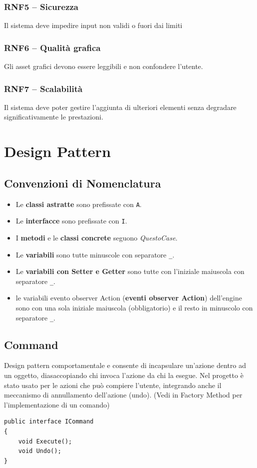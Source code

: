\subsubsection{RNF5 – Sicurezza}  Il sistema deve impedire input non validi o fuori dai limiti


\subsubsection{RNF6 – Qualità grafica} Gli asset grafici devono essere leggibili e non confondere l'utente.


\subsubsection{RNF7 – Scalabilità} Il sistema deve poter gestire l'aggiunta di ulteriori elementi senza degradare significativamente le prestazioni.

\section{Design Pattern}
\subsection{Convenzioni di Nomenclatura}

\begin{itemize}
  \item Le \textbf{classi astratte} sono prefissate con \texttt{A}.
  \item Le \textbf{interfacce} sono prefissate con \texttt{I}.
  \item I \textbf{metodi} e le \textbf{classi concrete} seguono \textit{QuestoCase}.
  \item Le \textbf{variabili} sono tutte minuscole con separatore \texttt{\_}.
  \item Le \textbf{variabili con Setter e Getter} sono tutte con l'iniziale maiuscola con separatore \texttt{\_}.
  \item le variabili evento observer Action (\textbf{eventi observer Action}) dell'engine sono con una sola iniziale maiuscola (obbligatorio) e il resto in minuscolo con separatore \texttt{\_}.
\end{itemize}

\subsection{Command}
Design pattern comportamentale e consente di incapsulare un'azione dentro ad un oggetto, diasaccopiando chi invoca l'azione da chi la esegue.
Nel progetto è stato usato per le azioni che può compiere l'utente, integrando anche il meccanismo di annullamento dell'azione (undo).
(Vedi in Factory Method per l'implementazione di un comando)
\begin{lstlisting}[language={[Sharp]C}]
public interface ICommand
{
    void Execute();
    void Undo();
}
\end{lstlisting}

